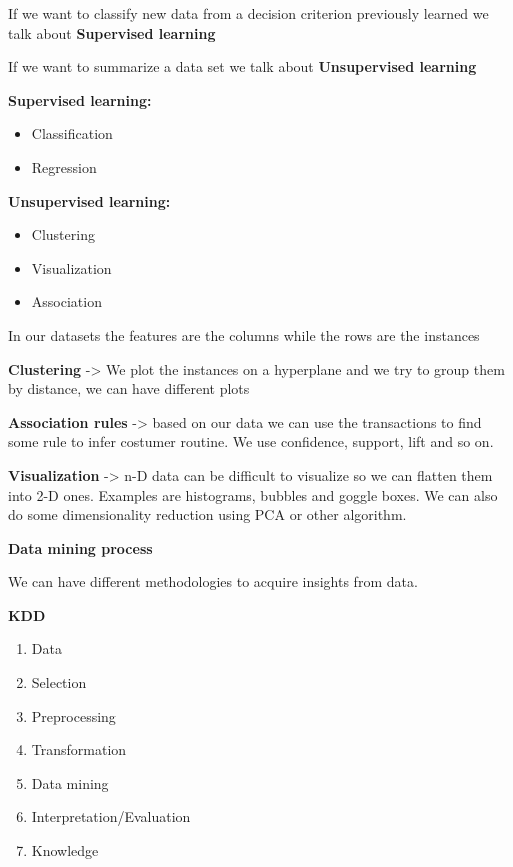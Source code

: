If we want to classify new data from a decision criterion previously learned we talk about \textbf{Supervised learning}

\vspace{10pt}

If we want to summarize a data set we talk about \textbf{Unsupervised learning}

\vspace{10pt}

\textbf{Supervised learning:}
\begin{itemize}
    \item Classification
    \item Regression
\end{itemize}

\textbf{Unsupervised learning:}
\begin{itemize}
    \item Clustering
    \item Visualization
    \item Association
\end{itemize}

\vspace{20pt}

In our datasets the features are the columns while the rows are the instances

\vspace{20pt}

\textbf{Clustering} -> We plot the instances on a hyperplane and we try to group them by distance, we can have different plots 

\textbf{Association rules} -> based on our data we can use the transactions to find some rule to infer costumer routine. We use confidence, support, lift and so on.

\textbf{Visualization} -> n-D data can be difficult to visualize so we can flatten them into 2-D ones. Examples are histograms, bubbles and goggle boxes. We can also do some dimensionality reduction using PCA or other algorithm.

\textbf{Data mining process}

We can have different methodologies to acquire insights from data.

\vspace{10pt}

\textbf{KDD}
\begin{enumerate}
    \item Data
    \item Selection
    \item Preprocessing
    \item Transformation
    \item Data mining
    \item Interpretation/Evaluation
    \item Knowledge  
\end{enumerate}

